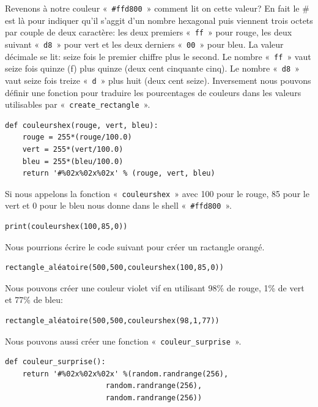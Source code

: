 Revenons à notre couleur «~\texttt{\#ffd800}~» comment lit on cette valeur? En fait le \# est là pour indiquer qu'il s'aggit d'un nombre hexagonal puis viennent trois octets par couple de deux caractère: les deux premiers «~\texttt{ff}~» pour rouge, les deux suivant «~\texttt{d8}~» pour vert et les deux derniers «~\texttt{00}~» pour bleu. La valeur décimale se lit: seize fois le premier chiffre plus le second. Le nombre «~\texttt{ff}~» vaut seize fois quinze (f) plus quinze (deux cent cinquante cinq). Le nombre «~\texttt{d8}~» vaut seize fois treize  «~\texttt{d}~» plus huit (deux cent seize). Inversement nous pouvons définir une fonction pour traduire les pourcentages de couleurs dans les valeurs utilisables par «~\texttt{create\_rectangle}~».

\begin{Verbatim}[frame=single,rulecolor=\color{mbleu}, label=à taper]
def couleurshex(rouge, vert, bleu):
    rouge = 255*(rouge/100.0)
    vert = 255*(vert/100.0)
    bleu = 255*(bleu/100.0)
    return '#%02x%02x%02x' % (rouge, vert, bleu)
\end{Verbatim}

Si nous appelons la fonction «~\texttt{couleurshex}~» avec 100 pour le rouge, 85 pour le vert et 0 pour le bleu nous donne dans le shell «~\texttt{\#ffd800}~».

\begin{Verbatim}[frame=single,rulecolor=\color{mbleu}, label=à taper]
print(couleurshex(100,85,0))
\end{Verbatim}

Nous pourrions écrire le code suivant pour créer un ractangle orangé.

\begin{Verbatim}[frame=single,rulecolor=\color{gray}, label=exemple]
rectangle_aléatoire(500,500,couleurshex(100,85,0))
\end{Verbatim}

Nous pouvons créer une couleur violet vif  en utilisant 98\% de rouge, 1\% de vert et 77\% de bleu:
\begin{Verbatim}[frame=single,rulecolor=\color{gray}, label=exemple]
rectangle_aléatoire(500,500,couleurshex(98,1,77))
\end{Verbatim}

Nous pouvons aussi créer une fonction «~\texttt{couleur\_surprise}~».
\begin{Verbatim}[frame=single,rulecolor=\color{mbleu}, label=à taper]
def couleur_surprise():
    return '#%02x%02x%02x' %(random.randrange(256),
                       random.randrange(256),
                       random.randrange(256))
\end{Verbatim}
 
